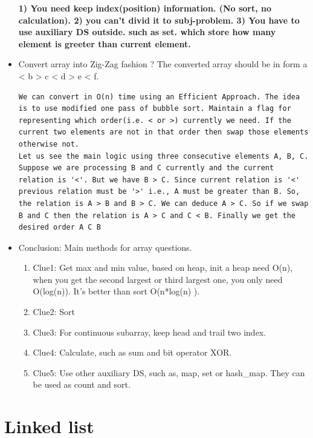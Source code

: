 \documentclass[a4paper,12pt,twoside]{book}
\begin{document}
\begin{itemize}
\begin{description}
\end{description}

\textbf{1) You need keep index(position) information. (No sort, no calculation).  2) you can't divid it to subj-problem. 3) You have to use auxiliary DS outside. such as set. which store how many element is greeter than current element.  }


\item Convert array into Zig-Zag fashion ? The converted array should be in form a < b > c < d > e < f. 
\begin{lstlisting}[breaklines]
We can convert in O(n) time using an Efficient Approach. The idea is to use modified one pass of bubble sort. Maintain a flag for representing which order(i.e. < or >) currently we need. If the current two elements are not in that order then swap those elements otherwise not.
Let us see the main logic using three consecutive elements A, B, C. Suppose we are processing B and C currently and the current relation is '<'. But we have B > C. Since current relation is '<' previous relation must be '>' i.e., A must be greater than B. So, the relation is A > B and B > C. We can deduce A > C. So if we swap B and C then the relation is A > C and C < B. Finally we get the desired order A C B
\end{lstlisting}


\item Conclusion: Main methods for array questions. 
\begin{enumerate}
\item Clue1: Get max and min value, based on heap, init a heap need O(n), when you get the second largest or third largest one, you only need O(log(n)). It's better than sort O(n*log(n) ). 



\item Clue2: Sort
\item Clue3: For continuous subarray, keep head and trail two index.
\item Clue4: Calculate, such as sum and bit operator XOR. 
\item Clue5: Use other auxiliary DS, such as, map, set or hash\_map.  They can be used as count and sort. 
\end{enumerate}

\end{itemize}

\section{Linked list}
\end{document}
